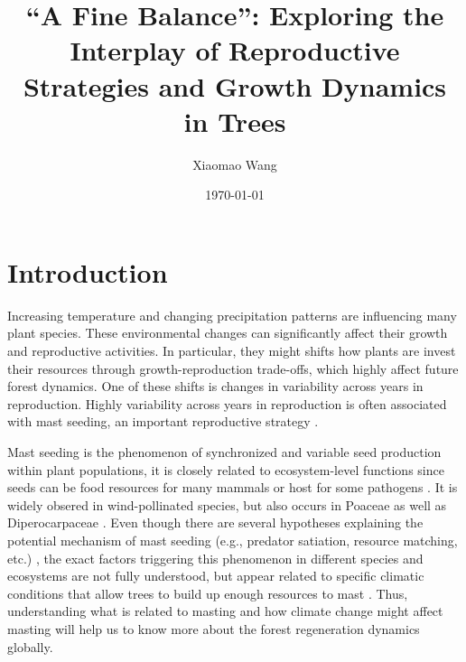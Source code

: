 \documentclass[11pt,letter]{article}
\begin{document}
\title{``A Fine Balance'': Exploring the Interplay of Reproductive Strategies and Growth Dynamics in Trees} %
\author{Xiaomao Wang} 
\date{\today}
\maketitle

\setlength{\parindent}{0pt}
\setlength{\parskip}{3pt}

\section{Introduction} %
Increasing temperature and changing precipitation patterns are influencing many plant species. These environmental changes can significantly affect their growth and reproductive activities. In particular, they might shifts how plants are invest their resources through growth-reproduction trade-offs, which highly affect future forest dynamics. One of these shifts is changes in variability across years in reproduction. Highly variability across years in reproduction is often associated with mast seeding, an important reproductive strategy \citep{pearse2016mechanisms}.\par
Mast seeding is the phenomenon of synchronized and variable seed production within plant populations, it is closely related to ecosystem-level functions since seeds can be food resources for many mammals or host for some pathogens  \citep{janzen1971seed, kelly1994evolutionary, davies2024seed}. It is widely obsered in wind-pollinated species, but also occurs in Poaceae as well as Diperocarpaceae  \citep{kelly2002mast}. Even though there are several hypotheses explaining the potential mechanism of mast seeding (e.g., predator satiation, resource matching, etc.)  \citep{koenig2021brief}, the exact factors triggering this phenomenon in different species and ecosystems are not fully understood, but appear related to specific climatic conditions that allow trees to build up enough resources to mast  \citep{pearse2016mechanisms}. Thus, understanding what is related to masting and how climate change might affect masting will help us to know more about the forest regeneration dynamics globally. 
\end{document}
